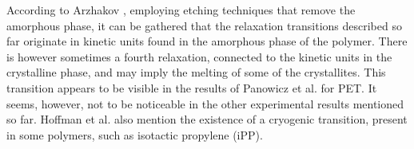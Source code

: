 According to Arzhakov \citep{arzhakovRelaxationPhysicalMechanical2019}, employing etching techniques that remove the amorphous phase, it can be gathered that the relaxation transitions described so far originate in kinetic units found in the amorphous phase of the polymer.
There is however sometimes a fourth relaxation, connected to the kinetic units in the crystalline phase, and may imply the melting of some of the crystallites.
This transition appears to be visible in the results of Panowicz et al. \citep{panowiczPropertiesPolyethyleneTerephthalate2021} for PET.
It seems, however, not to be noticeable in the other experimental results mentioned so far.
Hoffman et al. \citep{hoffmanAnalysisRelaxationsPolychlorotrifluoroethylene2007} also mention the existence of a cryogenic transition, present in some polymers, such as isotactic propylene (iPP).

